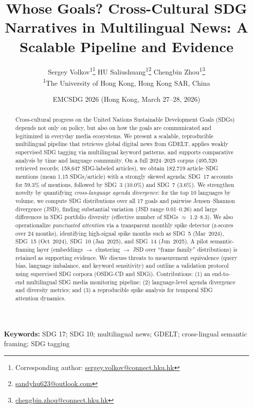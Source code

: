 \documentclass[11pt]{article}
\title{Whose Goals? Cross-Cultural SDG Narratives in Multilingual News: A Scalable Pipeline and Evidence}
\author{
Sergey Volkov\textsuperscript{1}\thanks{Corresponding author: \href{mailto:sergey.volkov@connect.hku.hk}{sergey.volkov@connect.hku.hk}} \quad
HU Saliushuang\textsuperscript{1}\thanks{\href{mailto:sandyhu623@outlook.com}{sandyhu623@outlook.com}} \quad
Chengbin Zhou\textsuperscript{1}\thanks{\href{mailto:chengbin.zhou@connect.hku.hk}{chengbin.zhou@connect.hku.hk}}\\
\textsuperscript{1}The University of Hong Kong, Hong Kong SAR, China
}
\date{EMCSDG 2026 (Hong Kong, March 27--28, 2026)}
\begin{document}
\maketitle

\begin{abstract}
Cross-cultural progress on the United Nations Sustainable Development Goals (SDGs) depends not only on policy, but also on how the goals are communicated and legitimized in everyday media ecosystems. We present a scalable, reproducible multilingual pipeline that retrieves global digital news from GDELT, applies weakly supervised SDG tagging via multilingual keyword patterns, and supports comparative analysis by time and language community. On a full 2024--2025 corpus (495{,}520 retrieved records; 158{,}647 SDG-labeled articles), we obtain 182{,}719 article--SDG mentions (mean 1.15 SDGs/article) with a strongly skewed agenda: SDG~17 accounts for 59.3\% of mentions, followed by SDG~3 (10.0\%) and SDG~7 (3.6\%). We strengthen novelty by quantifying \emph{cross-language agenda divergence}: for the top 10 languages by volume, we compute SDG distributions over all 17 goals and pairwise Jensen--Shannon divergence (JSD), finding substantial variation (JSD range 0.01--0.26) and large differences in SDG portfolio diversity (effective number of SDGs $\approx$ 1.2--8.3). We also operationalize \emph{punctuated attention} via a transparent monthly spike detector (z-scores over 24 months), identifying high-signal spike months such as SDG~5 (Mar~2024), SDG~15 (Oct~2024), SDG~10 (Jan~2025), and SDG~14 (Jun~2025). A pilot semantic-framing layer (embeddings $\rightarrow$ clustering $\rightarrow$ JSD over ``frame family'' distributions) is retained as supporting evidence. We discuss threats to measurement equivalence (query bias, language imbalance, and keyword sensitivity) and outline a validation protocol using supervised SDG corpora (OSDG-CD and SDGi). Contributions: (1) an end-to-end multilingual SDG media monitoring pipeline; (2) language-level agenda divergence and diversity metrics; and (3) a reproducible spike analysis for temporal SDG attention dynamics.
\end{abstract}

\noindent\textbf{Keywords:} SDG 17; SDG 10; multilingual news; GDELT; cross-lingual semantic framing; SDG tagging
\end{document}
